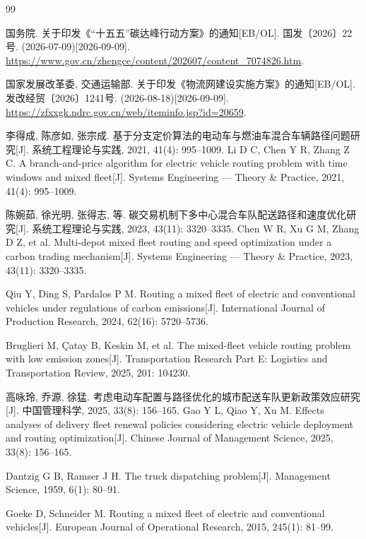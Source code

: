 \begin{thebibliography}{99}

 国务院. 关于印发《“十五五”碳达峰行动方案》的通知[EB/OL]. 国发〔2026〕22号. (2026-07-09)[2026-09-09].
\url{https://www.gov.cn/zhengce/content/202607/content_7074826.htm}.

 国家发展改革委, 交通运输部. 关于印发《物流网建设实施方案》的通知[EB/OL]. 发改经贸〔2026〕1241号. (2026-08-18)[2026-09-09].
\url{https://zfxxgk.ndrc.gov.cn/web/iteminfo.jsp?id=20659}.

 李得成, 陈彦如, 张宗成. 基于分支定价算法的电动车与燃油车混合车辆路径问题研究[J]. 系统工程理论与实践, 2021, 41(4): 995--1009.\newline
Li D C, Chen Y R, Zhang Z C. A branch-and-price algorithm for electric vehicle routing problem with time windows and mixed fleet[J]. Systems Engineering --- Theory \& Practice, 2021, 41(4): 995--1009.

 陈婉茹, 徐光明, 张得志, 等. 碳交易机制下多中心混合车队配送路径和速度优化研究[J]. 系统工程理论与实践, 2023, 43(11): 3320--3335.\newline
Chen W R, Xu G M, Zhang D Z, et al. Multi-depot mixed fleet routing and speed optimization under a carbon trading mechanism[J]. Systems Engineering --- Theory \& Practice, 2023, 43(11): 3320--3335.

 Qiu Y, Ding S, Pardalos P M. Routing a mixed fleet of electric and conventional vehicles under regulations of carbon emissions[J]. International Journal of Production Research, 2024, 62(16): 5720--5736.

 Bruglieri M, \c{C}atay B, Keskin M, et al. The mixed-fleet vehicle routing problem with low emission zones[J]. Transportation Research Part E: Logistics and Transportation Review, 2025, 201: 104230.

 高咏玲, 乔源, 徐猛. 考虑电动车配置与路径优化的城市配送车队更新政策效应研究[J]. 中国管理科学, 2025, 33(8): 156--165.\newline
Gao Y L, Qiao Y, Xu M. Effects analyses of delivery fleet renewal policies considering electric vehicle deployment and routing optimization[J]. Chinese Journal of Management Science, 2025, 33(8): 156--165.

 Dantzig G B, Ramser J H. The truck dispatching problem[J]. Management Science, 1959, 6(1): 80--91.

 Goeke D, Schneider M. Routing a mixed fleet of electric and conventional vehicles[J]. European Journal of Operational Research, 2015, 245(1): 81--99.


\end{thebibliography}
